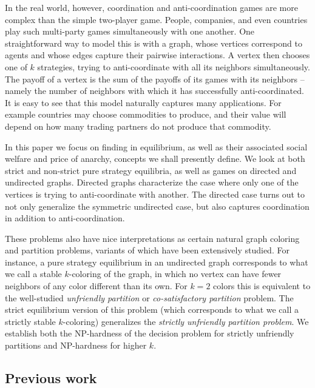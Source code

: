 \documentclass{llncs}
\begin{document}
In the real world, however, coordination and anti-coordination games are more
complex than the simple two-player game.  People, companies, and even countries
play such multi-party games simultaneously with one another. One
straightforward way to model this is with a graph, whose vertices correspond to
agents and whose edges capture their pairwise interactions.  A vertex then
chooses one of $k$ strategies, trying to anti-coordinate with all its neighbors
simultaneously.  The payoff of a vertex is the sum of the payoffs of its games
with its neighbors -- namely the number of neighbors with which it has
successfully anti-coordinated.  It is easy to see that this model naturally
captures many applications.  For example countries may choose commodities to
produce, and their value will depend on how many trading partners do not
produce that commodity.

In this paper we focus on finding  in equilibrium,
as well as their associated social welfare and price of anarchy, concepts we
shall presently define.  We look at both strict and non-strict  pure strategy
equilibria, as well as games on directed and undirected graphs.  Directed graphs
characterize the case where only one of the vertices is trying to anti-coordinate
with another.  The directed case turns out to not only generalize the symmetric
undirected case, but also captures coordination in addition to
anti-coordination.

These problems also have nice interpretations as certain natural graph coloring
and partition problems, variants of which have been extensively studied.  For
instance, a pure strategy equilibrium in an undirected graph corresponds to
what we call a stable $k$-coloring of the graph, in which no vertex can have fewer
neighbors of any color different than its own.  For $k=2$ colors this is equivalent
to the well-studied \emph{unfriendly partition} or \emph{co-satisfactory
partition} problem.  The strict equilibrium version of this problem (which
corresponds to what we call a strictly stable $k$-coloring) generalizes the
\emph{strictly unfriendly partition problem}. We establish both the NP-hardness
of the decision problem for strictly unfriendly partitions and NP-hardness for higher $k$.


\subsection{Previous work}
\end{document}

